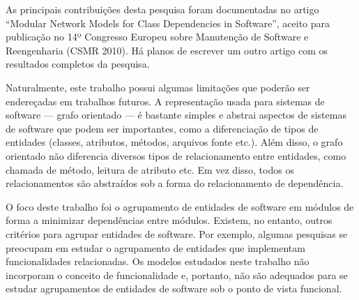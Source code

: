 As principais contribuições desta pesquisa foram documentadas no artigo ``Modular Network Models for Class Dependencies in Software'', aceito para publicação no 14º Congresso Europeu sobre Manutenção de Software e Reengenharia (CSMR 2010). Há planos de escrever um outro artigo com os resultados completos da pesquisa.


Naturalmente, este trabalho possui algumas limitações que poderão ser endereçadas em trabalhos futuros. A representação usada para sistemas de software --- grafo orientado --- é bastante simples e abstrai aspectos de sistemas de software que podem ser importantes, como a diferenciação de tipos de entidades (classes, atributos, métodos, arquivos fonte etc.). Além disso, o grafo orientado não diferencia diversos tipos de relacionamento entre entidades, como chamada de método, leitura de atributo etc. Em vez disso, todos os relacionamentos são abstraídos sob a forma do relacionamento de dependência.

O foco deste trabalho foi o agrupamento de entidades de software em módulos de forma a minimizar dependências entre módulos. Existem, no entanto, outros critérios para agrupar entidades de software. Por exemplo, algumas pesquisas se preocupam em estudar o agrupamento de entidades que implementam funcionalidades relacionadas. Os modelos estudados neste trabalho não incorporam o conceito de funcionalidade e, portanto, não são adequados para se estudar agrupamentos de entidades de software sob o ponto de vista funcional.

% 

